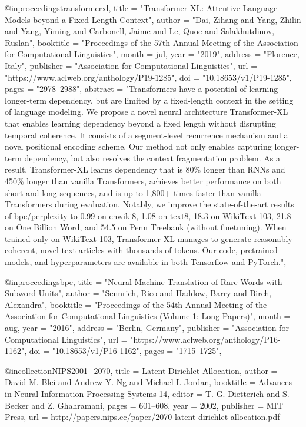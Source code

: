 @inproceedings{transformerxl,
    title = "Transformer-{XL}: Attentive Language Models beyond a Fixed-Length Context",
    author = "Dai, Zihang  and
      Yang, Zhilin  and
      Yang, Yiming  and
      Carbonell, Jaime  and
      Le, Quoc  and
      Salakhutdinov, Ruslan",
    booktitle = "Proceedings of the 57th Annual Meeting of the Association for Computational Linguistics",
    month = jul,
    year = "2019",
    address = "Florence, Italy",
    publisher = "Association for Computational Linguistics",
    url = "https://www.aclweb.org/anthology/P19-1285",
    doi = "10.18653/v1/P19-1285",
    pages = "2978--2988",
    abstract = "Transformers have a potential of learning longer-term dependency, but are limited by a fixed-length context in the setting of language modeling. We propose a novel neural architecture Transformer-XL that enables learning dependency beyond a fixed length without disrupting temporal coherence. It consists of a segment-level recurrence mechanism and a novel positional encoding scheme. Our method not only enables capturing longer-term dependency, but also resolves the context fragmentation problem. As a result, Transformer-XL learns dependency that is 80{\%} longer than RNNs and 450{\%} longer than vanilla Transformers, achieves better performance on both short and long sequences, and is up to 1,800+ times faster than vanilla Transformers during evaluation. Notably, we improve the state-of-the-art results of bpc/perplexity to 0.99 on enwiki8, 1.08 on text8, 18.3 on WikiText-103, 21.8 on One Billion Word, and 54.5 on Penn Treebank (without finetuning). When trained only on WikiText-103, Transformer-XL manages to generate reasonably coherent, novel text articles with thousands of tokens. Our code, pretrained models, and hyperparameters are available in both Tensorflow and PyTorch.",
}

@inproceedings{bpe,
    title = "Neural Machine Translation of Rare Words with Subword Units",
    author = "Sennrich, Rico  and
      Haddow, Barry  and
      Birch, Alexandra",
    booktitle = "Proceedings of the 54th Annual Meeting of the Association for Computational Linguistics (Volume 1: Long Papers)",
    month = aug,
    year = "2016",
    address = "Berlin, Germany",
    publisher = "Association for Computational Linguistics",
    url = "https://www.aclweb.org/anthology/P16-1162",
    doi = "10.18653/v1/P16-1162",
    pages = "1715--1725",
}

@incollection{NIPS2001_2070,
title = {Latent Dirichlet Allocation},
author = {David M. Blei and Andrew Y. Ng and Michael I. Jordan},
booktitle = {Advances in Neural Information Processing Systems 14},
editor = {T. G. Dietterich and S. Becker and Z. Ghahramani},
pages = {601--608},
year = {2002},
publisher = {MIT Press},
url = {http://papers.nips.cc/paper/2070-latent-dirichlet-allocation.pdf}
}


